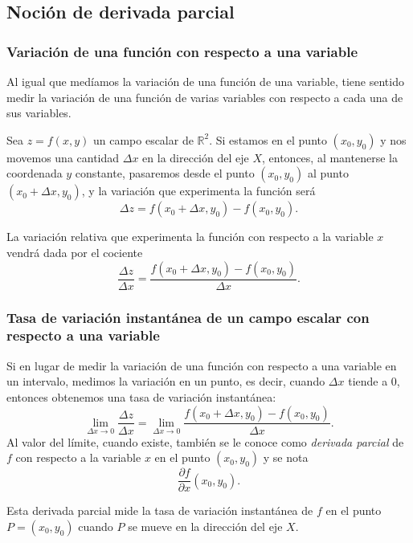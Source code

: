 \subsection{Noción de derivada parcial}
\begin{frame}
	\frametitle{Variación de una función con respecto a una variable}
	Al igual que medíamos la variación de una función de una variable, tiene sentido medir la variación de una función de
	varias variables con respecto a cada una de sus variables.
	
	Sea $z=f(x,y)$ un campo escalar de $\mathbb{R}^2$.
	Si estamos en el punto $(x_0,y_0)$ y nos movemos una cantidad $\Delta x$ en la dirección del eje $X$, entonces, al
	mantenerse la coordenada $y$ constante, pasaremos desde el punto $(x_0,y_0)$ al punto $(x_0+\Delta x,y_0)$, y la
	variación que experimenta la función será
	\[
		\Delta z=f(x_0+\Delta x,y_0)-f (x_0,y_0).
	\]
	
	La variación relativa que experimenta la función con respecto a la variable $x$ vendrá dada por el cociente 
	\[\frac{\Delta z}{\Delta x}=\frac{f(x_0+\Delta x,y_0)-f(x_0,y_0)}{\Delta x}.\]
\end{frame}


\begin{frame}
	\frametitle{Tasa de variación instantánea de un campo escalar con respecto a una variable}
	Si en lugar de medir la variación de una función con respecto a una variable en un intervalo, medimos la variación en un
	punto, es decir, cuando $\Delta x$ tiende a 0, entonces obtenemos una tasa de variación instantánea:
	\[
		\lim_{\Delta x\rightarrow 0}\frac{\Delta z}{\Delta x}=\lim_{\Delta x \rightarrow 0}\frac{f(x_0+\Delta x,y_0)-f(x_0,y_0)}{\Delta x}.
	\]
	Al valor del límite, cuando existe, también se le conoce como \emph{derivada parcial} de $f$ con respecto a la variable $x$ en el punto $(x_0,y_0)$ y se nota
	\[
		\frac{\partial f}{\partial x}(x_0,y_0).
	\]
	
	Esta derivada parcial mide la tasa de variación instantánea de $f$ en el punto $P=(x_0,y_0)$ cuando $P$ se mueve en la dirección del eje $X$.
\end{frame}


